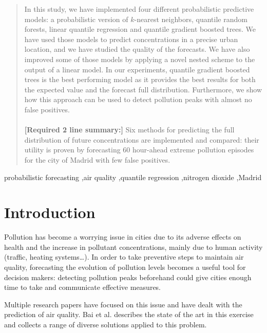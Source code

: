 \documentclass[a4paper,twocolumn,5p]{elsarticle}
\begin{document}
\begin{frontmatter}
\begin{abstract}
  In this study, we have %
  implemented four different probabilistic predictive models: a
  probabilistic version of $k$-nearest neighbors, quantile random
  forests, linear quantile regression and quantile gradient boosted
  trees.  We have used those models to predict \no concentrations in a
  precise urban location,
  and we have studied the quality of the forecasts.  We have also
  improved some of those models by applying a novel nested scheme to
  the output of a linear model. In our experiments, quantile gradient
  boosted trees is the best performing model as it provides the best
  results for both the expected value and the forecast full
  distribution. Furthermore, we show how this approach can be used to
  detect pollution peaks with almost no false positives.\\\\
  \textbf{[Required 2 line summary:]} Six methods for
  predicting the full distribution of future \no concentrations are
  implemented and compared: their utility is proven by forecasting 60
  hour-ahead extreme pollution episodes for the city of Madrid with few
  false positives.
\end{abstract}

\begin{keyword}
probabilistic forecasting \sep air quality \sep quantile regression
\sep nitrogen dioxide \sep Madrid
\end{keyword}

\end{frontmatter}


\section{Introduction }
\label{sec:intro}

Pollution has become a worrying issue in cities due to its adverse
effects on health and the increase in pollutant concentrations, mainly
due to human activity (traffic, heating systems\ldots). In order to
take preventive steps to maintain air quality, forecasting the
evolution of pollution levels becomes a useful tool for decision
makers: detecting pollution peaks beforehand could give cities enough
time to take and communicate effective measures.

Multiple research papers have focused on this issue and have dealt
with the prediction of air quality. Bai et al. \cite{bai_air_2018}
describes the state of the art in this exercise and collects a range
of diverse solutions applied to this problem.
\end{document}
